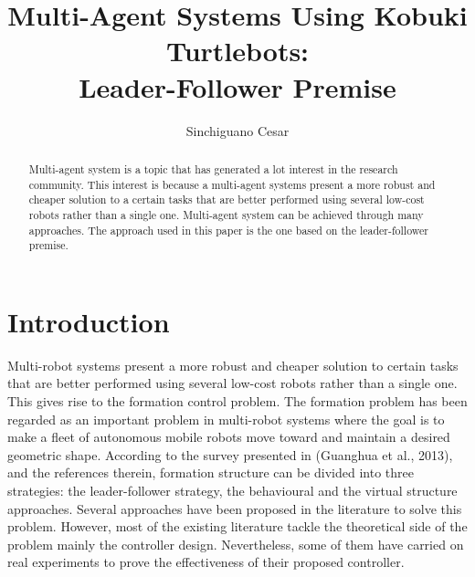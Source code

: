 \documentclass[journal]{IEEEtran}
\begin{document}
%
\title{Multi-Agent Systems Using Kobuki Turtlebots:\\Leader-Follower Premise}
\author{Sinchiguano Cesar}


\maketitle

\begin{abstract}

Multi-agent system is a topic that has generated a lot interest in the research community. This interest is because a multi-agent systems present a more robust and cheaper solution to a certain tasks that are better performed using several low-cost robots rather than a single one. Multi-agent system can be achieved through many approaches. The approach used in this paper is the one based on the leader-follower premise.
\end{abstract}


\section{Introduction}


Multi-robot systems present a more robust and cheaper solution to certain tasks that are better performed using several low-cost robots rather than a single one. This gives rise to the formation control problem. The formation problem has been regarded as an important problem in multi-robot systems where the goal is to make a fleet of autonomous mobile robots move toward and maintain a desired geometric shape. According to the survey presented in (Guanghua et al., 2013)\cite{temp1}, and the references therein, formation structure can be divided into three strategies: the leader-follower strategy, the behavioural and the virtual structure approaches. Several approaches have been proposed in the literature to solve this problem. However, most of the existing literature tackle the theoretical side of the problem mainly the controller design. Nevertheless, some of them have carried on real experiments to prove the effectiveness of their proposed controller. 
\end{document}
